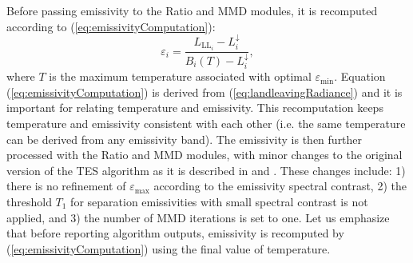 Before passing emissivity to the Ratio and MMD modules, it is  {recomputed} according to (\ref{eq:emissivityComputation}):
\begin{equation}
\varepsilon_{ {i}} = \frac{L_{\mathrm{LL}_{ {i}}} - L^\downarrow_{ {i}}}{B_{ {i}}(T) - L^\downarrow_{ {i}}},
\label{eq:emissivityComputation}
\end{equation}
where $T$ is the maximum temperature associated with optimal $\varepsilon_\mathrm{min}$.  {Equation (\ref{eq:emissivityComputation}) is derived from (\ref{eq:landleavingRadiance}) and it is important for relating temperature and emissivity. This recomputation keeps temperature and emissivity consistent with each other (i.e. the same temperature can be derived from any emissivity band).} The emissivity is then further processed with the Ratio and MMD modules, with minor changes to  {the} original version of the TES algorithm as it is described in \cite{GR98} and \cite{GR99}. These changes include: 1) there is no refinement of $\varepsilon_\mathrm{max}$ according to the emissivity spectral contrast, 2) the threshold $T_1$ for separation emissivities with small spectral contrast is not applied, and 3) the number of MMD iterations is set to one. Let us emphasize that before  
reporting algorithm outputs, emissivity is  {recomputed} by (\ref{eq:emissivityComputation}) using the final value of temperature.




